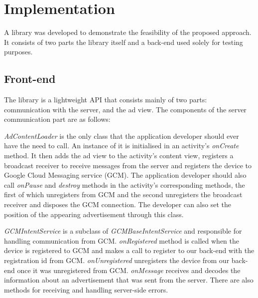 
\chapter{Implementation} %





\ifpdf
    \graphicspath{{X/figures/PNG/}{X/figures/PDF/}{X/figures/}}
\else
    \graphicspath{{X/figures/EPS/}{X/figures/}}
\fi

A library was developed to demonstrate the feasibility of the proposed approach. It consists of two parts the library itself and a back-end used solely for testing purposes.

\section{Front-end}

The library is a lightweight API that consists mainly of two parts: communication with the server,  and the ad view. The components of the server communication part are as follows:

\textit{AdContentLoader} is the only class that the application developer should ever have the need to call. An instance of it is initialised in an activity's \textit{onCreate} method. It then adds the ad view to the activity's content view, registers a broadcast receiver to receive messages from the server and registers the device to Google Cloud Messaging service (GCM).\cite{notifications:gcm} The application developer should also call \textit{onPause} and \textit{destroy} methods in the activity's corresponding methods, the first of which unregisters from GCM and the second unregisters the broadcast receiver and disposes the GCM connection. The developer can also set the position of the appearing advertisement through this class.

\textit{GCMIntentService} is a subclass of \textit{GCMBaseIntentService} and responsible for handling communication from GCM. \textit{onRegistered} method is called when the device is registered to GCM and makes a call to register to our back-end with the registration id from GCM. \textit{onUnregistered} unregisters the device from our back-end once it was unregistered from GCM. \textit{onMessage} receives and decodes the information about an advertisement that was sent from the server. There are also methods for receiving and handling server-side errors.

